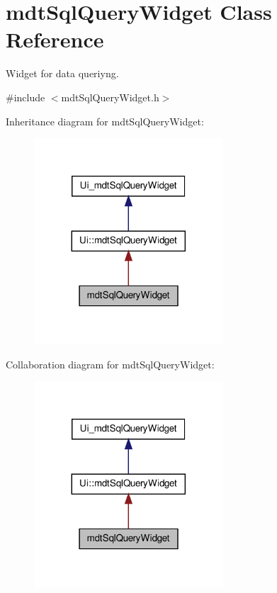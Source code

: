 \hypertarget{classmdt_sql_query_widget}{
\section{mdtSqlQueryWidget Class Reference}
\label{classmdt_sql_query_widget}
}


Widget for data queriyng.  




{\ttfamily \#include $<$mdtSqlQueryWidget.h$>$}



Inheritance diagram for mdtSqlQueryWidget:\nopagebreak
\begin{figure}[H]
\begin{center}
\leavevmode
\includegraphics[width=200pt]{classmdt_sql_query_widget__inherit__graph}
\end{center}
\end{figure}


Collaboration diagram for mdtSqlQueryWidget:\nopagebreak
\begin{figure}[H]
\begin{center}
\leavevmode
\includegraphics[width=200pt]{classmdt_sql_query_widget__coll__graph}
\end{center}
\end{figure}
